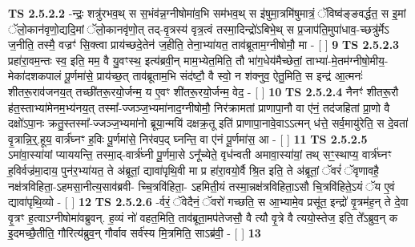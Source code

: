 \documentclass[17pt]{extarticle}
\begin{document}
                  \newline
                                \textbf{ TS 2.5.2.2} \newline
                  -न्द्रः॒ शत्रु॑रभव॒थ् स स॒भंव॑न्न॒ग्नीषोमा॑व॒भि सम॑भव॒थ् स इ॑षुमा॒त्रमि॑षुमात्रं॒ ॅविष्व॑ङ्ङवर्द्धत॒ स इ॒मां ॅलो॒कान॑वृणो॒द्यदि॒मां ॅलो॒कानवृ॑णो॒त् तद्-वृ॒त्रस्य॑ वृत्र॒त्वं तस्मा॒दिन्द्रो॑ऽबिभे॒थ् स प्र॒जाप॑ति॒मुपा॑धाव॒-च्छत्रु॑र्मेऽ ज॒नीति॒ तस्मै॒ वज्रꣳ॑ सि॒क्त्वा प्राय॑च्छदे॒तेन॑ ज॒हीति॒ तेना॒भ्या॑यत॒ ताव॑ब्रूताम॒ग्नीषोमौ॒ मा - [  ] \textbf{  9} \newline
                  \newline
                                \textbf{ TS 2.5.2.3} \newline
                  प्रहा॑रा॒वम॒न्तः स्व॒ इति॒ मम॒ वै यु॒वꣳस्थ॒ इत्य॑ब्रवी॒न् माम॒भ्येत॒मिति॒ तौ भा॑ग॒धेय॑मैच्छेतां॒ ताभ्या॑-मे॒तम॑ग्नीषो॒मीय॒-मेका॑दशकपालं पू॒र्णमा॑से॒ प्राय॑च्छ॒त् ताव॑ब्रूताम॒भि संद॑ष्टौ॒ वै स्वो॒ न श॑क्नुव॒ ऐतु॒मिति॒ स इन्द्र॑ आ॒त्मनः॑ शीतरू॒राव॑जनय॒त् तच्छी॑तरू॒रयो॒र्जन्म॒ य ए॒वꣳ शी॑तरू॒रयो॒र्जन्म॒ वेद॒ - [  ] \textbf{  10} \newline
                  \newline
                                \textbf{ TS 2.5.2.4} \newline
                  नैनꣳ॑ शीतरू॒रौ ह॑त॒स्ताभ्या॑मेनम॒भ्य॑नय॒त् तस्मा᳚-ज्जञ्ज॒भ्यमा॑नाद॒ग्नीषोमौ॒ निर॑क्रामतां प्राणापा॒नौ वा ए॑नं॒ तद॑जहितां प्रा॒णो वै दक्षो॑ऽपा॒नः क्रतु॒स्तस्मा᳚-ज्जञ्ज॒भ्यमा॑नो ब्रूया॒न्मयि॑ दक्षक्र॒तू इति॑ प्राणापा॒नावे॒वाऽऽत्मन् ध॑त्ते॒ सर्व॒मायु॑रेति॒ स दे॒वता॑ वृ॒त्रान्नि॒र्॒.हूय॒ वार्त्र॑घ्नꣳ ह॒विः पू॒र्णमा॑से॒ निर॑वप॒द् घ्नन्ति॒ वा ए॑नं पू॒र्णमा॑स॒ आ - [  ] \textbf{  11} \newline
                  \newline
                                \textbf{ TS 2.5.2.5} \newline
                  ऽमा॑वा॒स्या॑यां प्याययन्ति॒ तस्मा॒द्-वार्त्र॑घ्नी पू॒र्णमा॒से ऽनू᳚च्येते॒ वृध॑न्वती अमावा॒स्या॑यां॒ तथ् सꣳ॒॒स्थाप्य॒ वार्त्र॑घ्नꣳ ह॒विर्वज्र॑मा॒दाय॒ पुन॑र॒भ्या॑यत॒ ते अ॑ब्रूतां॒ द्यावा॑पृथि॒वी मा प्र हा॑रा॒वयो॒र्वै श्रि॒त इति॒ ते अ॑ब्रूतां॒ ॅवरं॑ ॅवृणावहै॒ नक्ष॑त्रविहिता॒-ऽहमसा॒नीत्य॒साव॑ब्रवी- च्चि॒त्रवि॑हिता॒- ऽहमिती॒यं तस्मा॒न्नक्ष॑त्रविहिता॒ऽसौ चि॒त्रवि॑हिते॒ऽयं ॅय ए॒वं द्यावा॑पृथि॒व्यो - [  ] \textbf{  12} \newline
                  \newline
                                \textbf{ TS 2.5.2.6} \newline
                  -र्वरं॒ ॅवेदैनं॒ ॅवरो॑ गच्छति॒ स आ॒भ्यामे॒व प्रसू॑त॒ इन्द्रो॑ वृ॒त्रम॑ह॒न् ते दे॒वा वृ॒त्रꣳ ह॒त्वाऽग्नीषोमा॑वब्रुवन्. ह॒व्यं नो॑ वहत॒मिति॒ ताव॑ब्रूता॒मप॑तेजसौ॒ वै त्यौ वृ॒त्रे वै त्ययो॒स्तेज॒ इति॒ ते᳚ऽब्रुव॒न् क इ॒दमच्छै॒तीति॒ गौरित्य॑ब्रुव॒न् गौर्वाव सर्व॑स्य मि॒त्रमिति॒ साऽब्र॑वी॒ - [  ] \textbf{  13} \newline
\end{document}

